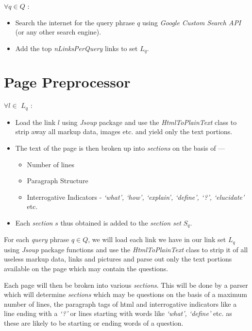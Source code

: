 \documentclass[a4paper,10pt]{report}
\begin{document}
$\forall q \in Q$ :

\begin{itemize}

	\item Search the internet for the query phrase $q$ using \emph{Google Custom Search API} (or any other search engine).
	\item Add the top \emph{nLinksPerQuery} links to set $L_{q}$.

\end{itemize}

\section{Page Preprocessor}

$\forall l \in$ $L_{q}$ :

\begin{itemize}
	\item Load the link $l$ using \emph{Jsoup} package and use the \emph{HtmlToPlainText} class to strip away all markup data, images etc. and yield only the text portions.
	\item The text of the page is then broken up into \emph{sections} on the basis of --- 
	\begin{itemize}
		\item Number of lines
		\item Paragraph Structure
		\item Interrogative Indicators - \emph{`what', `how', `explain', `define', `?', `elucidate'} etc.
	\end{itemize}
	\item Each \emph{section} $s$ thus obtained is added to the \emph{section set} $S_{q}$.
\end{itemize} 

\noindent For each \emph{query} phrase $q \in Q$, we will load each link we have in our link set $L_{q}$ using \emph{Jsoup} package functions and use the \emph{HtmlToPlainText} class to strip it of all useless markup data, links and pictures and parse out only the text portions available on the page which may contain the questions. 

Each page will then be broken into various \emph{sections}. This will be done by a parser which will determine \emph{sections} which may be questions on the basis of a maximum number of lines, the paragraph tags of html and interrogative indicators like a line ending with a \emph{`?'} or lines starting with words like \emph{`what', `define'} etc. as these are likely to be starting or ending words of a question.
\end{document}
